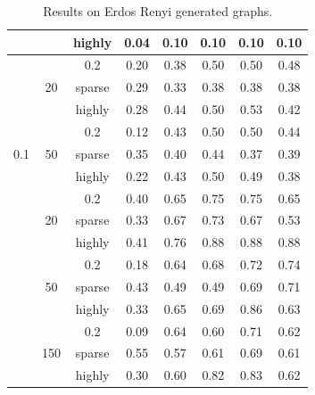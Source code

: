 \documentclass[12pt, twocolumn]{article}
\begin{document}
\begin{table}[h]
\begin{adjustbox}{max width=\textwidth}
\begin{tabular}{cccccccc}
        & & highly & 0.04 & 0.10 & 0.10 & 0.10 & 0.10 \\
        \midrule
        \multirow{9}{*}{0.1} & \multirow{3}{*}{20} & 0.2 & 0.20 & 0.38 & 0.50 & 0.50 & 0.48 \\
        & & sparse & 0.29 & 0.33 & 0.38 & 0.38 & 0.38 \\
        & & highly & 0.28 & 0.44 & 0.50 & 0.53 & 0.42 \\
        \cmidrule(lr){2-8}
        & \multirow{3}{*}{50} & 0.2 & 0.12 & 0.43 & 0.50 & 0.50 & 0.44 \\
        & & sparse & 0.35 & 0.40 & 0.44 & 0.37 & 0.39 \\
        & & highly & 0.22 & 0.43 & 0.50 & 0.49 & 0.38 \\
        \midrule
        \multirow{9}{*}{0.05} & \multirow{3}{*}{20} & 0.2 & 0.40 & 0.65 & 0.75 & 0.75 & 0.65 \\
        & & sparse & 0.33 & 0.67 & 0.73 & 0.67 & 0.53 \\
        & & highly & 0.41 & 0.76 & 0.88 & 0.88 & 0.88 \\
        \cmidrule(lr){2-8}
        & \multirow{3}{*}{50} & 0.2 & 0.18 & 0.64 & 0.68 & 0.72 & 0.74 \\
        & & sparse & 0.43 & 0.49 & 0.49 & 0.69 & 0.71 \\
        & & highly & 0.33 & 0.65 & 0.69 & 0.86 & 0.63 \\
        \cmidrule(lr){2-8}
        & \multirow{3}{*}{150} & 0.2 & 0.09 & 0.64 & 0.60 & 0.71 & 0.62 \\
        & & sparse & 0.55 & 0.57 & 0.61 & 0.69 & 0.61 \\
        & & highly & 0.30 & 0.60 & 0.82 & 0.83 & 0.62 \\
        \bottomrule
    \end{tabular}
    \end{adjustbox}
    \caption{Results on Erdos Renyi generated graphs.}
    \label{tab:results}
\end{table}
\end{document}
